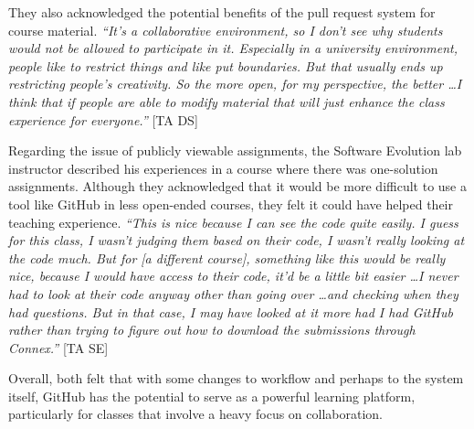 They also acknowledged the potential benefits of the pull request system for course material. \textit{``It's a collaborative environment, so I don't see why students would not be allowed to participate in it. Especially in a university environment, people like to restrict things and like put boundaries. But that usually ends up restricting people's creativity. So the more open, for my perspective, the better \ldots I think that if people are able to modify material that will just enhance the class experience for everyone.''} [TA DS]

Regarding the issue of publicly viewable assignments, the Software Evolution lab instructor described his experiences in a course where there was one-solution assignments. Although they acknowledged that it would be more difficult to use a tool like GitHub in less open-ended courses, they felt it could have helped their teaching experience. \textit{``This is nice because I can see the code quite easily. I guess for this class, I wasn't judging them based on their code, I wasn't really looking at the code much. But for [a different course], something like this would be really nice, because I would have access to their code, it'd be a little bit easier \ldots I never had to look at their code anyway other than going over \ldots and checking when they had questions. But in that case, I may have looked at it more had I had GitHub rather than trying to figure out how to download the submissions through Connex.''} [TA SE]

Overall, both felt that with some changes to workflow and perhaps to the system itself, GitHub has the potential to serve as a powerful learning platform, particularly for classes that involve a heavy focus on collaboration.





